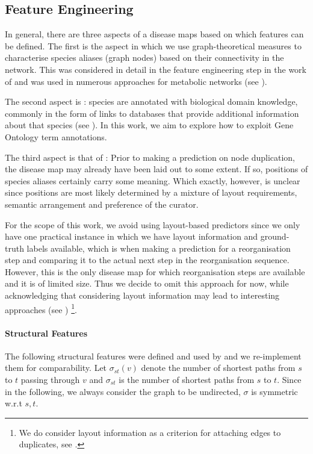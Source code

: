 \documentclass[
	fontsize=10pt, %
	twoside=false, %
	secnumdepth=1, %
  toc=indentunnumbered %
]{kaobook}
\begin{document}
\subsection{Feature Engineering}
\label{sec:feature-selection}


In general, there are three aspects of a disease maps based on which features
can be defined. The first is the  aspect in which we use
graph-theoretical measures to characterise species aliases (graph nodes) based
on their connectivity in the network. This was considered in detail in the
feature engineering step in the work of
\citeauthor{nielsen_MachineLearningSupport_2019} and was used in numerous
approaches for metabolic networks (see ).

The second aspect is : species are annotated with biological
domain knowledge, commonly in the form of links to databases that provide
additional information about that species (see ). In
this work, we aim to explore how to exploit Gene Ontology term annotations.

The third aspect is that of : Prior to making a prediction on node
duplication, the disease map may already have been laid out to some extent.
If so, positions of species aliases certainly carry some meaning. Which exactly,
however, is unclear since positions are most likely determined by a mixture of
layout requirements, semantic arrangement and preference of the curator.

For the scope of this work, we avoid using layout-based predictors
since we only have one practical instance in which we have layout information
and ground-truth labels available, which is when making a prediction for a
 reorganisation step and comparing it to the actual next
step in the reorganisation sequence. However, this is the only disease map for
which reorganisation steps are available and it is of limited size. Thus we
decide to omit this approach for now, while acknowledging that considering
layout information may lead to interesting approaches (see
) \footnote{ We do consider layout information as a
  criterion for attaching edges to duplicates, see . }.




\paragraph{Structural Features} The following structural features were defined
and used by \citeauthor{nielsen_MachineLearningSupport_2019} and we re-implement
them for comparability. Let $\sigma_{st}(v)$ denote the number of shortest paths
from $s$ to $t$ passing through $v$ and $\sigma_{st}$ is the number of shortest
paths from $s$ to $t$. Since in the following, we always consider the graph to
be undirected, $\sigma$ is symmetric w.r.t $s, t$. 
\end{document}
